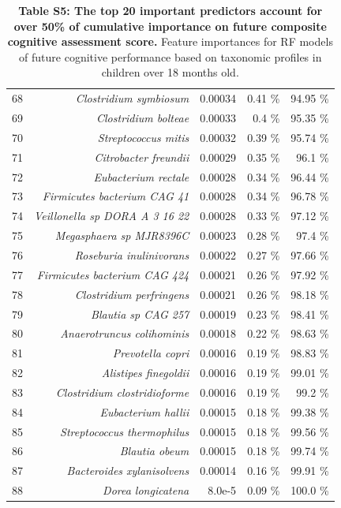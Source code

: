 \documentclass{article}
\begin{document}
\begin{table}
\begin{centering}
\begin{tabular}{|r|r|r|r|r|}
  68 & \textit{Clostridium symbiosum} & 0.00034 & 0.41 \% & 94.95 \% \\
  69 & \textit{Clostridium bolteae} & 0.00033 & 0.4 \% & 95.35 \% \\
  70 & \textit{Streptococcus mitis} & 0.00032 & 0.39 \% & 95.74 \% \\
  71 & \textit{Citrobacter freundii} & 0.00029 & 0.35 \% & 96.1 \% \\
  72 & \textit{Eubacterium rectale} & 0.00028 & 0.34 \% & 96.44 \% \\
  73 & \textit{Firmicutes bacterium CAG 41} & 0.00028 & 0.34 \% & 96.78 \% \\
  74 & \textit{Veillonella sp DORA A 3 16 22} & 0.00028 & 0.33 \% & 97.12 \% \\
  75 & \textit{Megasphaera sp MJR8396C} & 0.00023 & 0.28 \% & 97.4 \% \\
  76 & \textit{Roseburia inulinivorans} & 0.00022 & 0.27 \% & 97.66 \% \\
  77 & \textit{Firmicutes bacterium CAG 424} & 0.00021 & 0.26 \% & 97.92 \% \\
  78 & \textit{Clostridium perfringens} & 0.00021 & 0.26 \% & 98.18 \% \\
  79 & \textit{Blautia sp CAG 257} & 0.00019 & 0.23 \% & 98.41 \% \\
  80 & \textit{Anaerotruncus colihominis} & 0.00018 & 0.22 \% & 98.63 \% \\
  81 & \textit{Prevotella copri} & 0.00016 & 0.19 \% & 98.83 \% \\
  82 & \textit{Alistipes finegoldii} & 0.00016 & 0.19 \% & 99.01 \% \\
  83 & \textit{Clostridium clostridioforme} & 0.00016 & 0.19 \% & 99.2 \% \\
  84 & \textit{Eubacterium hallii} & 0.00015 & 0.18 \% & 99.38 \% \\
  85 & \textit{Streptococcus thermophilus} & 0.00015 & 0.18 \% & 99.56 \% \\
  86 & \textit{Blautia obeum} & 0.00015 & 0.18 \% & 99.74 \% \\
  87 & \textit{Bacteroides xylanisolvens} & 0.00014 & 0.16 \% & 99.91 \% \\
  88 & \textit{Dorea longicatena} & 8.0e-5 & 0.09 \% & 100.0 \% \\\hline
\end{tabular}
\caption*{
  \textbf{Table S5: The top 20 important predictors account for over 50\%
  of cumulative importance on future composite cognitive assessment score.}
  Feature importances for RF models of future cognitive performance
  based on taxonomic profiles in children over 18 months old.
}
\end{centering}
\end{table}
\end{document}
